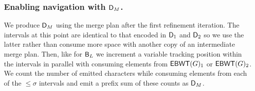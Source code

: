 \subsubsection{Enabling navigation with $\mbox{\rm {\sf D}}_M$.}

We produce $\mbox{\rm {\sf D}}_M$ using the merge plan after the first refinement iteration.  The intervals at this point are identical to that encoded in $\mbox{\rm {\sf D}}_1$ and $\mbox{\rm {\sf D}}_2$ so we use the latter rather than consume more space with another copy of an intermediate merge plan.  Then, like for $\mathsf{B}_L$ we increment a variable tracking position within the intervals in parallel with consuming elements from $\mathsf{EBWT}(G)_1$ or $\mathsf{EBWT}(G)_2$. We count the number of emitted characters while consuming elements from each of the $\leq\sigma$ intervals and emit a prefix sum of these counts as $\mbox{\rm {\sf D}}_M$.














































